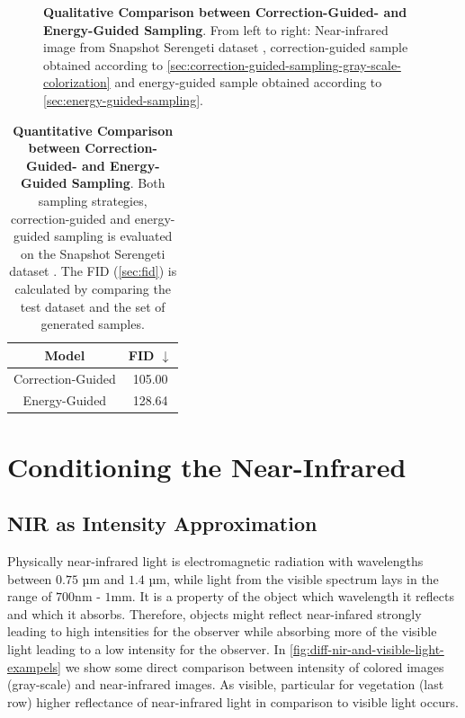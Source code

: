 \begin{figure}[htp!]
\begin{tabularx}{\textwidth}{Y Y Y !{\space} Y Y Y}
    \end{tabularx}
    \caption{
        \textbf{Qualitative Comparison between Correction-Guided- and Energy-Guided Sampling}.
        From left to right:
        Near-infrared image from Snapshot Serengeti dataset \parencite{serengeti},
        correction-guided sample obtained according to \autoref{sec:correction-guided-sampling-gray-scale-colorization}
        and
        energy-guided sample obtained according to \autoref{sec:energy-guided-sampling}.
    }
    \label{fig:qualitative-evaluation-loss-guided-vs-correction-guided}
\end{figure}

\begin{table}[htp!]
    \centering
    \begin{tabular}{c | c}
        Model             & FID  $\downarrow$ \\
        \hline\hline
        Correction-Guided & 105.00            \\
        Energy-Guided     & 128.64
    \end{tabular}
    \caption{
        \textbf{Quantitative Comparison between Correction-Guided- and Energy-Guided Sampling}.
        Both sampling strategies, correction-guided and energy-guided sampling is evaluated on the Snapshot Serengeti dataset \parencite{serengeti}.
        The FID (\autoref{sec:fid}) \parencite{ttur} is calculated by comparing the test dataset and the set of generated samples.
    }
    \label{fig:quantitative-evaluation-loss-guided-vs-correction-guided}
\end{table}



\section{Conditioning the Near-Infrared}
\subsection{NIR as Intensity Approximation}
\label{sec:nir-as-intensity-approximation-evaluation}
Physically near-infrared light is electromagnetic radiation with wavelengths between $0.75$ µm and $1.4$ µm, while light from the visible spectrum lays in the range of $700$nm - $1$mm.
It is a property of the object which wavelength it reflects and which it absorbs.
Therefore, objects might reflect near-infared strongly leading to high intensities for the observer while absorbing more of the visible light leading to a low intensity for the observer.
In \autoref{fig:diff-nir-and-visible-light-exampels} we show some direct comparison between intensity of colored images (gray-scale) and near-infrared images.
As visible, particular for vegetation (last row) higher reflectance of near-infrared light in comparison to visible light occurs.  


